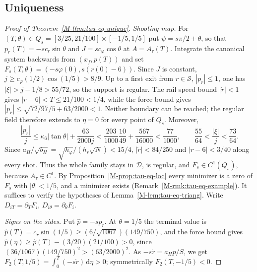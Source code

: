 \documentclass[aip,jmp,amsmath,amssymb,reprint]{revtex4-2}
\newcommand{\dd}{\mathrm{d}}
\theoremstyle{plain}
\theoremstyle{definition}
\begin{document}
\subsection{Uniqueness}
\begin{proof}[Proof of Theorem~\ref{M-thm:tau-eq-unique}]
\emph{Shooting map.} For $(T,\theta)\in Q_s=[3/25,21/100]\times[-1/5,1/5]$
put $\psi=s\pi/2+\theta$, so that $p_r(T)=-sc_r\sin\theta$ and
$J=sc_\varphi\cos\theta$ at $A=A_\tau(T)$. Integrate the canonical system
backwards from $(x_f,p(T))$ and set
$F_s(T,\theta)=(-s\varphi(0),s(r(0)-6))$.
Since $J$ is constant, $j\ge c_\varphi(1/2)\cos(1/5)>8/9$.
Up to a first exit from $r\in\mathcal S$, $|p_r|\le1$, one has
$|\xi|>j-1/8>55/72$, so the support is regular. The rail speed bound
$|\dot r|<1$ gives $|r-6|<T\le21/100<1/4$, while the force bound gives
$|p_r|\le\sqrt{72/97}/5+63/2000<1$. Neither boundary can be reached;
the regular field therefore extends to $\eta=0$ for every point of $Q_s$.
Moreover,
\[
 \frac{|p_r|}{j}\le\kappa_6|\tan\theta|+\frac{63}{2000j}
 <\frac{203}{1000}\frac{10}{49}+\frac{567}{16000}<\frac{77}{1000},\qquad
 \frac{55}{64}<\frac{|\xi|}{j}<\frac{73}{64}.
\]
Since $a_H/\sqrt{b_H}=\sqrt{h_\varphi}/(h_r\sqrt N)<15/4$,
$|\dot r|<84/250$ and $|r-6|<3/40$ along every shot.
Thus the whole family stays in $\mathcal D$, is regular, and
$F_s\in C^1(Q_s)$, because $A_\tau\in C^1$.
By Proposition~\ref{M-prop:tau-eq-loc} every minimizer is a zero of $F_s$
with $|\theta|<1/5$, and a minimizer exists (Remark~\ref{M-rmk:tau-eq-example}).
It suffices to verify the hypotheses of Lemma~\ref{M-lem:tau-eq-triang}.
Write $D_{iT}=\partial_TF_i$, $D_{i\theta}=\partial_\theta F_i$.

\emph{Signs on the sides.} Put $\hat p=-sp_r$. At $\theta=1/5$ the terminal value is
$\hat p(T)=c_r\sin(1/5)\ge(6/\sqrt{1067})(149/750)$, and the force bound gives
$\hat p(\eta)\ge \hat p(T)-(3/20)(21/100)>0$, since $(36/1067)(149/750)^2>(63/2000)^2$. As $-s\dot r=a_H\hat p/S$, we get
$F_2(T,1/5)=\int_0^T(-s\dot r)\,\dd\eta>0$; symmetrically $F_2(T,-1/5)<0$.


\end{proof}
\end{document}
